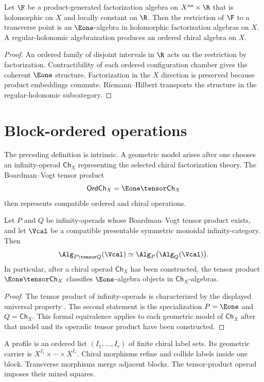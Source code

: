 \begin{theorem}
Let $\F$ be a product-generated factorization algebra on $X^{\mathrm{an}}\times\R$ that is holomorphic on $X$ and locally constant on $\R$. Then the restriction of $\F$ to a transverse point is an $\Eone$-algebra in holomorphic factorization algebras on $X$. A regular-holonomic algebraization produces an ordered chiral algebra on $X$.
\end{theorem}
\begin{proof}
An ordered family of disjoint intervals in $\R$ acts on the restriction by factorization. Contractibility of each ordered configuration chamber gives the coherent $\Eone$ structure. Factorization in the $X$ direction is preserved because product embeddings commute. Riemann--Hilbert transports the structure in the regular-holonomic subcategory.
\end{proof}

\chapter{Block-ordered operations}
The preceding definition is intrinsic. A geometric model arises after one chooses an infinity-operad $\mathsf{Ch}_X$ representing the selected chiral factorization theory. The Boardman--Vogt tensor product
\[
 \mathsf{OrdCh}_X=\Eone\tensor\mathsf{Ch}_X
\]
then represents compatible ordered and chiral operations.

\begin{theorem}
Let $P$ and $Q$ be infinity-operads whose Boardman--Vogt tensor product exists, and let $\Vcal$ be a compatible presentable symmetric monoidal infinity-category.  Then
\[
 \Alg_{P\tensor Q}(\Vcal)
 \simeq
 \Alg_P\bigl(\Alg_Q(\Vcal)\bigr).
\]
In particular, after a chiral operad $\mathsf{Ch}_X$ has been constructed, the tensor product $\Eone\tensor\mathsf{Ch}_X$ classifies $\Eone$-algebra objects in $\mathsf{Ch}_X$-algebras.
\end{theorem}
\begin{proof}
The tensor product of infinity-operads is characterized by the displayed universal property \cite{LurieHA}.  The second statement is the specialization $P=\Eone$ and $Q=\mathsf{Ch}_X$.  This formal equivalence applies to each geometric model of $\mathsf{Ch}_X$ after that model and its operadic tensor product have been constructed.
\end{proof}

A profile is an ordered list $(I_1,\ldots,I_r)$ of finite chiral label sets. Its geometric carrier is $X^{I_1}\times\cdots\times X^{I_r}$. Chiral morphisms refine and collide labels inside one block. Transverse morphisms merge adjacent blocks. The tensor-product operad imposes their mixed squares.

